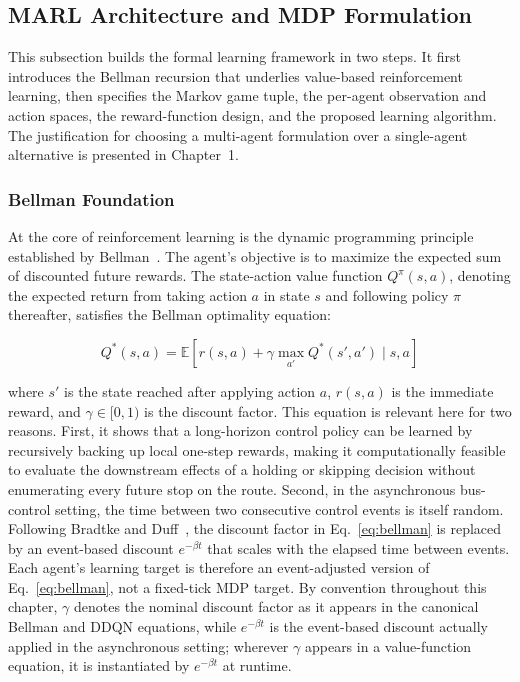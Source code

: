 \subsection{MARL Architecture and MDP Formulation}\label{subsec:marl-arch}

This subsection builds the formal learning framework in two steps. It first introduces the Bellman recursion that underlies value-based reinforcement learning, then specifies the Markov game tuple, the per-agent observation and action spaces, the reward-function design, and the proposed learning algorithm. The justification for choosing a multi-agent formulation over a single-agent alternative is presented in Chapter~1.

\subsubsection{Bellman Foundation}

At the core of reinforcement learning is the dynamic programming principle established by Bellman~\cite{Bellman1957}. The agent's objective is to maximize the expected sum of discounted future rewards. The state-action value function $Q^\pi(s,a)$, denoting the expected return from taking action $a$ in state $s$ and following policy $\pi$ thereafter, satisfies the Bellman optimality equation:

\begin{equation}
Q^*(s, a) = \mathbb{E} \left[ r(s, a) + \gamma \max_{a'} Q^*(s', a') \mid s, a \right]
\label{eq:bellman}
\end{equation}

where $s'$ is the state reached after applying action $a$, $r(s,a)$ is the immediate reward, and $\gamma \in [0, 1)$ is the discount factor. This equation is relevant here for two reasons. First, it shows that a long-horizon control policy can be learned by recursively backing up local one-step rewards, making it computationally feasible to evaluate the downstream effects of a holding or skipping decision without enumerating every future stop on the route. Second, in the asynchronous bus-control setting, the time between two consecutive control events is itself random. Following Bradtke and Duff~\cite{Bradtke1995}, the discount factor in Eq.~\eqref{eq:bellman} is replaced by an event-based discount $e^{-\beta t}$ that scales with the elapsed time between events. Each agent's learning target is therefore an event-adjusted version of Eq.~\eqref{eq:bellman}, not a fixed-tick MDP target. By convention throughout this chapter, $\gamma$ denotes the nominal discount factor as it appears in the canonical Bellman and DDQN equations, while $e^{-\beta t}$ is the event-based discount actually applied in the asynchronous setting; wherever $\gamma$ appears in a value-function equation, it is instantiated by $e^{-\beta t}$ at runtime.


